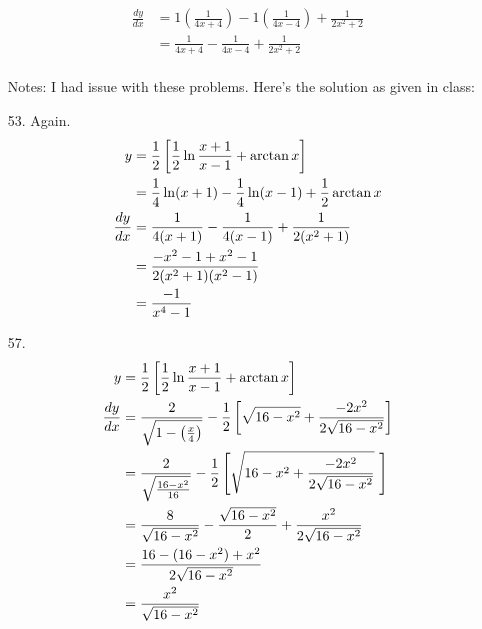 \documentclass[11pt]{article}
\begin{document}
\begin{enumerate}
\begin{align}
			\frac{dy}{dx} &= 1\left(\frac{1}{4x+4}\right) - 
			1\left(\frac{1}{4x-4}\right) + \frac{1}{2x^2+2} \\
			&= \frac{1}{4x+4} - \frac{1}{4x-4} + \frac{1}{2x^2+2}
		\end{align}
		\\ Notes: I had issue with these problems.  Here's the solution as
		given in class:
	\item[53. ] Again.
		\begin{align}
			\setcounter{equation}{0}
			y &= \frac{1}{2}\left[\frac{1}{2}\ln\frac{x+1}{x-1}+\arctan x\right] \\
			&= \frac{1}{4}\ln(x+1) - \frac{1}{4} \ln (x-1) + \frac{1}{2}\arctan x \\
			\frac{dy}{dx} &= \frac{1}{4(x+1)} -\frac{1}{4(x-1)}+\frac{1}{2(x^2+1)} \\
			&= \frac{-x^2-1+x^2-1}{2(x^2+1)(x^2-1)} \\
			&= \frac{-1}{x^4-1}
		\end{align}
	\item[57. ]
		\begin{align}
			\setcounter{equation}{0}
			y &= \frac{1}{2}\left[\frac{1}{2}\ln\frac{x+1}{x-1}+\arctan x\right] \\
			\frac{dy}{dx} &= \frac{2}{\sqrt{1-\left(\frac{x}{4}\right)}} 
			- \frac{1}{2}\left[\sqrt{16-x^2} + \frac{-2x^2}{2\sqrt{16-x^2}}\right] \\
			&= \frac{2}{\sqrt{\frac{16-x^2}{16}}} - \frac{1}{2}\left[\sqrt{16-x^2
			+ \frac{-2x^2}{2\sqrt{16-x^2}}}\ \right] \\
			&= \frac{8}{\sqrt{16-x^2}} - \frac{\sqrt{16-x^2}}{2} + \frac{x^2}
			{2\sqrt{16-x^2}} \\
			&= \frac{16 - (16-x^2)+x^2}{2\sqrt{16-x^2}} \\
			&= \frac{x^2}{\sqrt{16-x^2}}
		\end{align}
	\end{enumerate}
\end{document}
